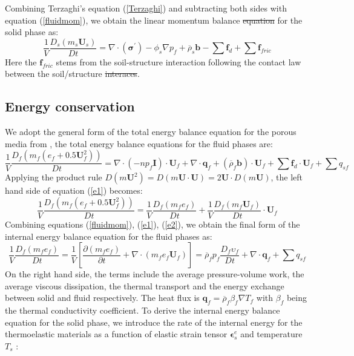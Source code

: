 \documentclass[preprint,12pt]{elsarticle}
\providecommand{\DIFadd}[1]{{\protect\color{blue}\uwave{#1}}} %
\providecommand{\DIFdel}[1]{{\protect\color{red}\sout{#1}}}                      %
\providecommand{\DIFaddbegin}{} %
\providecommand{\DIFaddend}{} %
\providecommand{\DIFdelbegin}{} %
\providecommand{\DIFdelend}{} %
\newcommand{\DIFscaledelfig}{0.5}
\newlength{\DIFdelgraphicswidth} %
\newlength{\DIFdelgraphicsheight} %
\newcommand{\DIFaddincludegraphics}[2][]{{\color{blue}\fbox{\DIFOincludegraphics[#1]{#2}}}} %
\newcommand{\DIFdelincludegraphics}[2][]{%
\sbox{\DIFdelgraphicsbox}{\DIFOincludegraphics[#1]{#2}}%
\settoboxwidth{\DIFdelgraphicswidth}{\DIFdelgraphicsbox} %
\settoboxtotalheight{\DIFdelgraphicsheight}{\DIFdelgraphicsbox} %
\scalebox{\DIFscaledelfig}{%
\parbox[b]{\DIFdelgraphicswidth}{\usebox{\DIFdelgraphicsbox}\\[-\baselineskip] \rule{\DIFdelgraphicswidth}{0em}}\llap{\resizebox{\DIFdelgraphicswidth}{\DIFdelgraphicsheight}{%
\setlength{\unitlength}{\DIFdelgraphicswidth}%
\begin{picture}(1,1)%
\thicklines\linethickness{2pt} %
{\color[rgb]{1,0,0}\put(0,0){\framebox(1,1){}}}%
{\color[rgb]{1,0,0}\put(0,0){\line( 1,1){1}}}%
{\color[rgb]{1,0,0}\put(0,1){\line(1,-1){1}}}%
\end{picture}%
}\hspace*{3pt}}} %
} %
\DeclareRobustCommand{\DIFaddbegin}{\DIFOaddbegin \let\includegraphics\DIFaddincludegraphics} %
\DeclareRobustCommand{\DIFaddend}{\DIFOaddend \let\includegraphics\DIFOincludegraphics} %
\DeclareRobustCommand{\DIFdelbegin}{\DIFOdelbegin \let\includegraphics\DIFdelincludegraphics} %
\DeclareRobustCommand{\DIFdelend}{\DIFOaddend \let\includegraphics\DIFOincludegraphics} %
\begin{document}
%
%
Combining Terzaghi's equation (\ref{Terzaghi}) and subtracting both sides with equation (\ref{fluidmom}), we obtain the linear momentum balance \DIFdelbegin \DIFdel{equation }\DIFdelend \DIFaddbegin \DIFadd{equations }\DIFaddend for the solid phase as:
%
%
\begin{equation}
    \label{solidmom}
     \frac{1}{V}\frac{D_s(m_s \pmb{U}_s)}{Dt} = 
    \nabla \cdot (\pmb{\sigma}^\prime) - \phi_s \nabla p_f 
    + \overline{\rho}_s \pmb{b}   -  \sum \pmb{f}_{d} +  \sum \pmb{f}_{fric}
\end {equation}
%
%
Here the $\pmb{f}_{fric}$ stems from the soil-structure interaction following the contact law between the soil/structure \DIFdelbegin \DIFdel{interaces}\DIFdelend \DIFaddbegin \DIFadd{interfaces}\DIFaddend .
\subsection{\textsf{Energy conservation}}
We adopt the general form of the total energy balance equation for the porous media from \cite{Hassanizadeh}, the total energy balance equations for the fluid phases are:
%
%
\begin{equation}
\label{e1}
     \frac{1}{V}\frac{D_f(m_f (e_f+0.5\pmb{U}_f^2))}{Dt} = \nabla \cdot (-np_f\pmb{I}) \cdot \pmb{U}_f + \nabla \cdot \pmb{q}_f + (\overline{\rho}_f \pmb{b}) \cdot \pmb{U}_f +  \sum \pmb{f}_{d} \cdot \pmb{U}_f +  \sum q_{sf}
\end {equation}
%
%
Applying the product rule $D(m\pmb{U}^2)=D(m \pmb{U} \cdot \pmb{U}) = 2 \pmb{U} \cdot D(m \pmb{U})$, the left hand side of equation (\ref{e1}) becomes:\\
%
%
\begin{equation}
\label{e2}
     \frac{1}{V}\frac{D_f(m_f (e_f+0.5\pmb{U}_f^2))}{Dt}  = \frac{1}{V}\frac{D_f(m_f e_f)}{Dt} + \frac{1}{V}\frac{D_f(m_f \pmb{U}_f)}{Dt} \cdot \pmb{U}_f 
\end {equation}
%
%
Combining equations (\ref{fluidmom}), (\ref{e1}), (\ref{e2}), we obtain the final form of the internal energy balance equation for the fluid phases as:
%
%
\begin{equation}
     \frac{1}{V}\frac{D_f(m_f e_f)}{Dt} = \frac{1}{V} \left[ \frac{\partial (m_f e_f)}{\partial t} + \nabla \cdot  (m_f e_f \pmb{U}_f) \right] 
   = \overline{\rho}_f p_f  \frac{D_f\upsilon_f}{Dt} + \nabla \cdot \pmb{q}_f +  \sum q_{sf}
\end {equation}
%
%
On the right hand side, the terms include the average pressure-volume work, the average viscous dissipation, the thermal transport and the energy exchange between solid and fluid respectively. The heat flux is $\pmb{q}_f = \overline{\rho}_f \beta_f \nabla T_f$ with $\beta_f$ being the thermal conductivity coefficient. To derive the internal energy balance equation for the solid phase, we introduce the rate of the internal energy  for the thermoelastic materials as a function of elastic strain tensor $\pmb{\epsilon}_s^e$ and temperature $T_s$ \DIFaddbegin \DIFadd{as belows}\DIFaddend :
\end{document}
